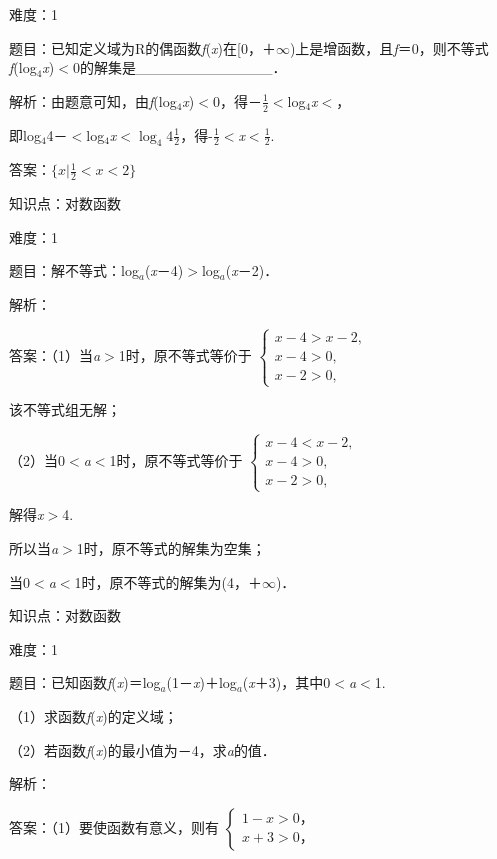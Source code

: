 \documentclass{article} %
\begin{document}
难度：1

题目：已知定义域为R的偶函数\textit{f}(\textit{x})在[0，＋$\mathrm{\infty}$)上是增函数，且\textit{f}＝0，则不等式\textit{f}(log${}_{4}$\textit{x})$\mathrm{<}$0的解集是\_\_\_\_\_\_\_\_\_\_\_\_\_．

解析：由题意可知，由\textit{f}(log${}_{4}$\textit{x})$\mathrm{<}$0，得－$\frac{1}{2}$$\mathrm{<}$log${}_{4}$\textit{x}$\mathrm{<}$，

即log${}_{4}$4－$\mathrm{<}$log${}_{4}$\textit{x}$\mathrm{<}$$\log_4 4\frac{1}{2}$，得-$\frac{1}{2}$$\mathrm{<}$\textit{x}$\mathrm{<}$$\frac{1}{2}$.

答案：$\{x|\frac{1}{2}<x<2\}$

知识点：对数函数

难度：1

题目：解不等式：log\textit{${}_{a}$}(\textit{x}－4)$\mathrm{>}$log\textit{${}_{a}$}(\textit{x}－2)．

解析：

答案：（1）当\textit{a}$\mathrm{>}$1时，原不等式等价于
$ \left\{
\begin{array}{l}
x-4>x-2,\\
x-4>0,\\
x-2>0,
\end{array}
\right.
$

该不等式组无解；

（2）当0$\mathrm{<}$\textit{a}$\mathrm{<}$1时，原不等式等价于
$ \left\{
\begin{array}{l}
x-4<x-2,\\
x-4>0,\\
x-2>0,
\end{array}
\right.
$

解得\textit{x}$\mathrm{>}$4.

所以当\textit{a}$\mathrm{>}$1时，原不等式的解集为空集；

当0$\mathrm{<}$\textit{a}$\mathrm{<}$1时，原不等式的解集为(4，＋$\mathrm{\infty}$)．

知识点：对数函数

难度：1

题目：已知函数\textit{f}(\textit{x})＝log\textit{${}_{a}$}(1－\textit{x})＋log\textit{${}_{a}$}(\textit{x}＋3)，其中0$\mathrm{<}$\textit{a}$\mathrm{<}$1.

（1）求函数\textit{f}(\textit{x})的定义域；

（2）若函数\textit{f}(\textit{x})的最小值为－4，求\textit{a}的值．

解析：

答案：（1）要使函数有意义，则有
$ \left\{
\begin{array}{l}
1-x>0，\\
x+3>0，
\end{array}
\right.
$
\end{document}
